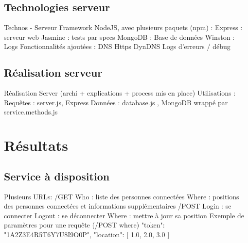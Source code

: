\documentclass{beamer} %
\begin{document}
\begin{frame}{\subsecname}

  \end{frame}

  \begin{frame}{\subsecname}
    
  \end{frame}

  \subsection{Technologies serveur}
  \begin{frame}{\subsecname}
    Technos - Serveur
    Framework NodeJS, avec plusieurs paquets (npm) :
    Express : serveur web
    Jasmine : tests par specs
    MongoDB : Base de données
    Winston : Logs
    Fonctionnalités ajoutées :
    DNS
    Https
    DynDNS
    Logs d’erreurs / débug
  \end{frame}

  \subsection{Réalisation serveur}
  \begin{frame}{\subsecname}
    Réalisation Server (archi + explications + process mis en place)
    Utilisations :
    Requêtes : server.js, Express
    Données : database.js , MongoDB wrappé par service.methods.js
  \end{frame}

  \section{Résultats}
  \subsection{Service à disposition}
  \begin{frame}{\subsecname}
    Plusieurs URLs:
    /GET
    Who : liste des personnes connectées
    Where : positions des personnes connectées et informations supplémentaires
    /POST
    Login : se connecter
    Logout : se déconnecter
    Where : mettre à jour sa position
    Exemple de paramètres pour une requête (/POST where){
        "token": "1A2Z3E4R5T6Y7U8I9O0P",
        "location": [
            1.0,
            2.0,
            3.0
        ]
    }  
  \end{frame}
\end{document}
